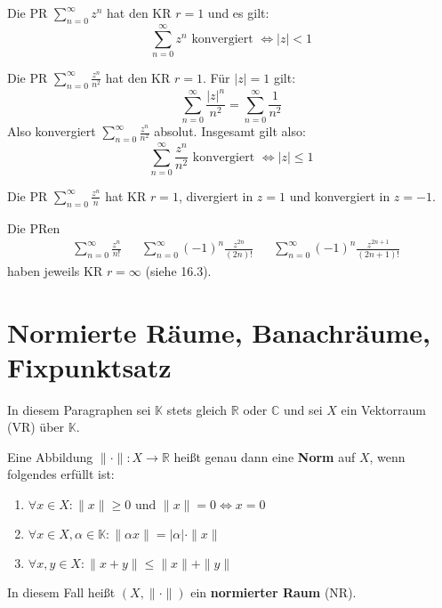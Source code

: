 \documentclass[a4paper,oneside,DIV15,BCOR12mm,chapterprefix=true,headings=onelinechapter]{scrbook}
\begin{document}
\begin{beispiele}
\item Die PR $\sum_{n=0}^\infty z^n$ hat den KR $r=1$ und es gilt:
\[\sum_{n=0}^\infty z^n\text{ konvergiert }\iff |z|<1\]
\item Die PR $\sum_{n=0}^\infty \frac{z^n}{n^2}$ hat den KR $r=1$. Für $|z|=1$ gilt:
\[\sum_{n=0}^\infty \frac{|z|^n}{n^2}=\sum_{n=0}^\infty \frac1{n^2}\]
Also konvergiert $\sum_{n=0}^\infty \frac{z^n}{n^2}$ absolut. Insgesamt gilt also:
\[\sum_{n=0}^\infty \frac{z^n}{n^2}\text{ konvergiert }\iff |z|\le 1\]
\item Die PR $\sum_{n=0}^\infty \frac{z^n}{n}$ hat KR $r=1$, divergiert in $z=1$ und
konvergiert in $z=-1$.
\item Die PRen
\begin{align*}
&\sum_{n=0}^\infty \frac{z^n}{n!}&&\sum_{n=0}^\infty(-1)^n\frac{z^{2n}}{(2n)!}
&&\sum_{n=0}^\infty (-1)^n\frac{z^{2n+1}}{(2n+1)!}
\end{align*}
haben jeweils KR $r=\infty$ (siehe 16.3).
\end{beispiele}

\chapter{Normierte Räume, Banachräume, Fixpunktsatz}
In diesem Paragraphen sei $\mathbb{K}$ stets gleich $\mathbb{R}$ oder $\mathbb{C}$
und sei $X$ ein Vektorraum (VR) über $\mathbb{K}$.

\begin{definition}
Eine Abbildung $\|\cdot\|:X\to\mathbb{R}$ heißt genau dann eine \textbf{Norm} auf $X$,
wenn folgendes erfüllt ist:
\begin{enumerate}
\item $\forall x\in X: \|x\|\ge0 \text{ und } \|x\|=0\iff x=0$
\item $\forall x\in X,\alpha\in\mathbb{K}:\|\alpha x\|=|\alpha|\cdot\|x\|$
\item $\forall x,y\in X: \|x+y\|\le \|x\|+\|y\|$
\end{enumerate}
In diesem Fall heißt $(X,\|\cdot\|)$ ein \textbf{normierter Raum} (NR).
\end{definition}
\end{document}
